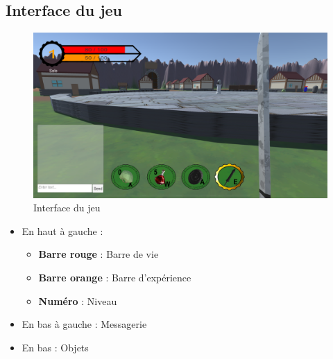 \documentclass[a4paper]{article}
\begin{document}
	\subsection{Interface du jeu}
	\begin{figure}[!ht]
		\centering
		\includegraphics[scale=0.3]{images/hud.png}
		\caption{Interface du jeu}
	\end{figure}
	\begin{itemize}
		\item En haut à gauche :
		\begin{itemize}
			\item \textbf{Barre rouge} : Barre de vie
			\item \textbf{Barre orange} : Barre d'expérience
			\item \textbf{Numéro} : Niveau
		\end{itemize}
		\item En bas à gauche : Messagerie
		\item En bas : Objets
	\end{itemize}
	
\end{document}
